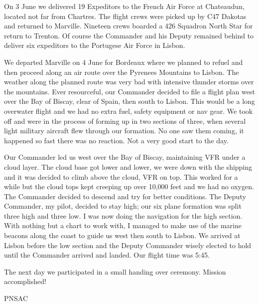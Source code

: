 On 3 June we delivered 19 Expeditors to the French Air Force at
Chateaudun, located not far from Chartres. The flight crews were
picked up by C47 Dakotas and returned to Marville. Nineteen crews
boarded a 426 Squadron North Star for return to Trenton. Of course the
Commander and his Deputy remained behind to deliver six expeditors to
the Portugese Air Force in Lisbon.

We departed Marville on 4 June for Bordeaux where we planned to refuel
and then proceed along an air route over the Pyrenees Mountains to
Lisbon. The weather along the planned route was very bad with
intensive thunder storms over the mountains. Ever resourceful, our
Commander decided to file a flight plan west over the Bay of Biscay,
clear of Spain, then south to Lisbon. This would be a long overwater
flight and we had no extra fuel, safety equipment or nav gear. We took
off and were in the process of forming up in two sections of three,
when several light military aircraft flew through our formation. No
one saw them coming, it happened so fast there was no reaction. Not a
very good start to the day.

Our Commander led us west over the Bay of Biscay, maintaining VFR
under a cloud layer. The cloud  base got lower and lower, we were down
with the shipping and it was decided to climb above the cloud, VFR on
top. This worked for a while but the cloud tops kept creeping up over
10,000 feet and we had no oxygen. The Commander decided to descend and
try for better conditions. The Deputy Commander, my pilot, decided to
stay high; our six plane formation was split three high and three
low. I was now doing the navigation for the high section. With nothing
but a chart to work with, I managed to make use of the marine beacons
along the coast to guide us west then south to Lisbon. We arrived at
Lisbon before the low section and the Deputy Commander wisely elected
to hold until the Commander arrived and landed. Our flight time was
5:45.

The next day we participated in a small handing over ceremony. Mission
accomplished!



\begin{footnotesize}
    \raggedleft PNSAC\\
\end{footnotesize}



